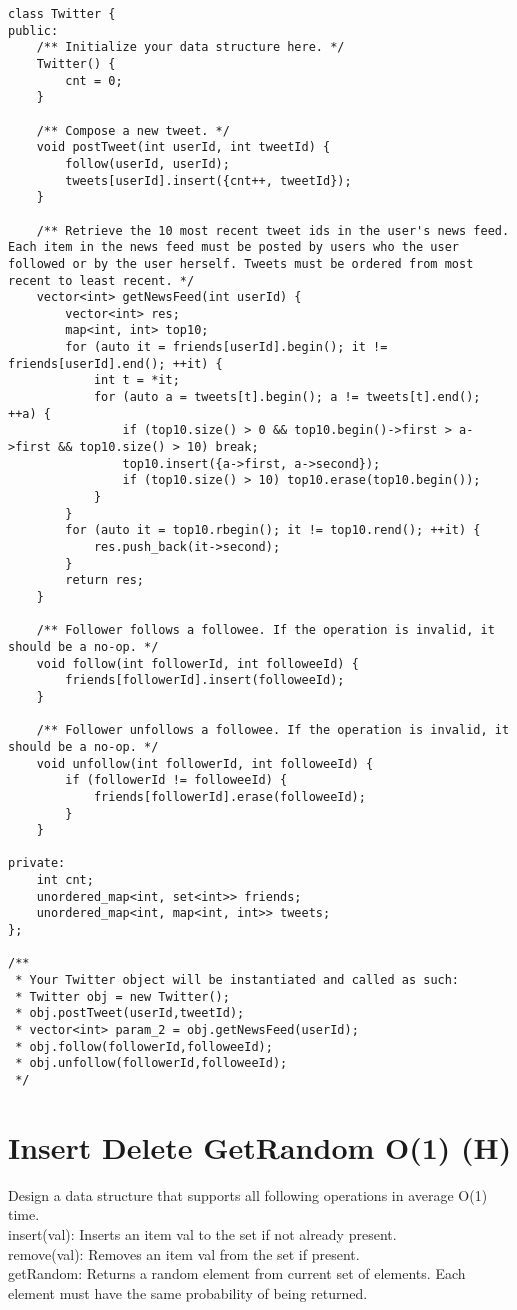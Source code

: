 \begin{lstlisting}
class Twitter {
public:
    /** Initialize your data structure here. */
    Twitter() {
        cnt = 0;
    }
    
    /** Compose a new tweet. */
    void postTweet(int userId, int tweetId) {
        follow(userId, userId);
        tweets[userId].insert({cnt++, tweetId});
    }
    
    /** Retrieve the 10 most recent tweet ids in the user's news feed. Each item in the news feed must be posted by users who the user followed or by the user herself. Tweets must be ordered from most recent to least recent. */
    vector<int> getNewsFeed(int userId) {
        vector<int> res;
        map<int, int> top10;
        for (auto it = friends[userId].begin(); it != friends[userId].end(); ++it) {
            int t = *it;
            for (auto a = tweets[t].begin(); a != tweets[t].end(); ++a) {
                if (top10.size() > 0 && top10.begin()->first > a->first && top10.size() > 10) break;
                top10.insert({a->first, a->second});
                if (top10.size() > 10) top10.erase(top10.begin());
            }
        }
        for (auto it = top10.rbegin(); it != top10.rend(); ++it) {
            res.push_back(it->second);
        }
        return res;
    }
    
    /** Follower follows a followee. If the operation is invalid, it should be a no-op. */
    void follow(int followerId, int followeeId) {
        friends[followerId].insert(followeeId);
    }
    
    /** Follower unfollows a followee. If the operation is invalid, it should be a no-op. */
    void unfollow(int followerId, int followeeId) {
        if (followerId != followeeId) {
            friends[followerId].erase(followeeId);
        }
    }
    
private:
    int cnt;
    unordered_map<int, set<int>> friends;
    unordered_map<int, map<int, int>> tweets;
};

/**
 * Your Twitter object will be instantiated and called as such:
 * Twitter obj = new Twitter();
 * obj.postTweet(userId,tweetId);
 * vector<int> param_2 = obj.getNewsFeed(userId);
 * obj.follow(followerId,followeeId);
 * obj.unfollow(followerId,followeeId);
 */
\end{lstlisting}


\section{Insert Delete GetRandom O(1) (H)}
Design a data structure that supports all following operations in average O(1) time.\\
    insert(val): Inserts an item val to the set if not already present.\\
    remove(val): Removes an item val from the set if present.\\
    getRandom: Returns a random element from current set of elements. Each element must have the same probability of being returned.\\

